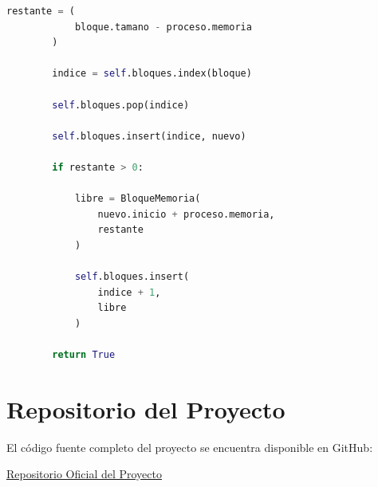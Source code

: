 \begin{lstlisting}[language=Python]
        restante = (
            bloque.tamano - proceso.memoria
        )

        indice = self.bloques.index(bloque)

        self.bloques.pop(indice)

        self.bloques.insert(indice, nuevo)

        if restante > 0:

            libre = BloqueMemoria(
                nuevo.inicio + proceso.memoria,
                restante
            )

            self.bloques.insert(
                indice + 1,
                libre
            )

        return True
\end{lstlisting}

\section{Repositorio del Proyecto}

El código fuente completo del proyecto se encuentra disponible en GitHub:

\begin{center}
\href{https://github.com/Elemauz/Gestion-de-Memoria}
{Repositorio Oficial del Proyecto}
\end{center}
